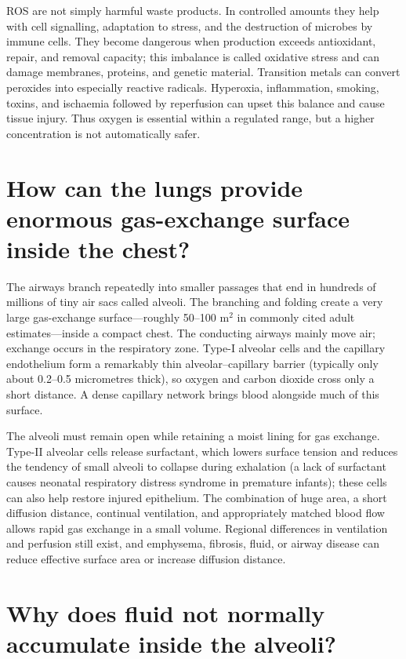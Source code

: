 \documentclass[11pt,oneside]{report}
\begin{document}
ROS are not simply harmful waste products. In controlled amounts they help
with cell signalling, adaptation to stress, and the destruction of microbes by
immune cells. They become dangerous when production exceeds antioxidant,
repair, and removal capacity; this imbalance is called oxidative stress and
can damage membranes, proteins, and genetic material. Transition metals can
convert peroxides into especially reactive radicals. Hyperoxia, inflammation,
smoking, toxins, and ischaemia followed by reperfusion can upset this balance
and cause tissue injury. Thus oxygen is essential within a regulated range,
but a higher concentration is not automatically safer.

\section{How can the lungs provide enormous gas-exchange surface inside the chest?}

The airways branch repeatedly into smaller passages that end in hundreds of
millions of tiny air sacs called alveoli. The branching and folding create a
very large gas-exchange surface---roughly 50--100 $\mathrm{m}^{2}$ in commonly
cited adult estimates---inside a compact chest. The conducting airways mainly
move air; exchange occurs in the respiratory zone. Type-I alveolar cells and
the capillary endothelium form a remarkably thin alveolar--capillary barrier
(typically only about 0.2--0.5 micrometres thick), so oxygen and carbon dioxide
cross only a short distance. A dense capillary
network brings blood alongside much of this surface.

The alveoli must remain open while retaining a moist lining for gas exchange.
Type-II alveolar cells release surfactant, which lowers surface tension and
reduces the tendency of small alveoli to collapse during exhalation (a lack of
surfactant causes neonatal respiratory distress syndrome in premature infants);
these cells can also help restore injured epithelium. The combination of huge area,
a short diffusion distance, continual ventilation, and appropriately matched
blood flow allows rapid gas exchange in a small volume. Regional differences
in ventilation and perfusion still exist, and emphysema, fibrosis, fluid, or
airway disease can reduce effective surface area or increase diffusion
distance.

\section{Why does fluid not normally accumulate inside the alveoli?}
\end{document}
